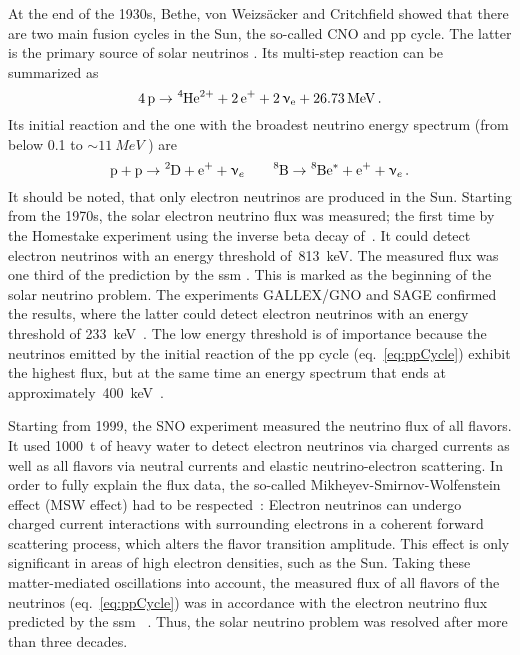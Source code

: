 At the end of the 1930s, Bethe, von Weizsäcker and Critchfield showed that there are two main fusion cycles in the Sun, the so-called CNO and pp cycle. The latter is the primary source of solar neutrinos \cite{Weiz1938, Bethe38, Bethe39}. Its multi-step reaction can be summarized as~\cite{zuber2011neutrino}
\begin{equation}
	\ce{4p} 
	\rightarrow 
	\ce{^4He^{2+}} +
	\ce{2e^+} +
	\ce{2\eneutrino} +
	\SI{26.73}{MeV}
	\fullstop
\end{equation}
Its initial reaction and the one with the broadest neutrino energy spectrum (from below 0.1 to $\sim\SI{11}{MeV}$ \cite{ReviewOfParticlePhysics}) are
\begin{equation}
\ce{p} + \ce{p} \rightarrow \ce{^2D} + \ce{e^+} + \upnu_e
\qquad
\ce{^8B} \rightarrow \ce{^8Be^*} + \ce{e^+} + \upnu_e \fullstop
\label{eq:ppCycle}
\end{equation}
It should be noted, that only electron neutrinos are produced in the Sun. Starting from the 1970s, the solar electron neutrino flux was measured; the first time by the Homestake experiment using the inverse beta decay of~. It could detect electron neutrinos with an energy threshold of~\SI{813}{keV}. The measured flux was one third of the prediction by the \gls{ssm} \cite{Cleveland1998, Bahcall2001}. This is marked as the beginning of the solar neutrino problem. The experiments GALLEX/GNO and SAGE confirmed the results, where the latter could detect electron neutrinos with an energy threshold of \SI{233}{keV}~\cite{Kirsten1998, Altmann2005, Abdurashitov2009}. The low energy threshold is of importance because the neutrinos emitted by the initial reaction of the pp cycle (eq.~\ref{eq:ppCycle}) exhibit the highest flux, but at the same time an energy spectrum that ends at approximately~\SI{400}{keV}~\cite{Bahcall1996}. 

Starting from 1999, the SNO experiment measured the neutrino flux of all flavors. It used \SI{1000}{t} of heavy water  to detect electron neutrinos via charged currents as well as all flavors via neutral currents and elastic neutrino-electron scattering. In order to fully explain the flux data, the so-called Mikheyev-Smirnov-Wolfenstein effect (MSW effect) had to be respected~\cite{Wolfenstein1977, Mikheev1986}: Electron neutrinos can undergo charged current interactions with surrounding electrons in a coherent forward scattering process, which alters the flavor transition amplitude. This effect is only significant in areas of high electron densities, such as the Sun. Taking these matter-mediated oscillations into account, the measured flux of all flavors of the  neutrinos (eq.~\ref{eq:ppCycle}) was in accordance with the electron neutrino flux predicted by the \gls{ssm}~ \cite{Aharmim2013}. Thus, the solar neutrino problem was resolved after more than three decades.

